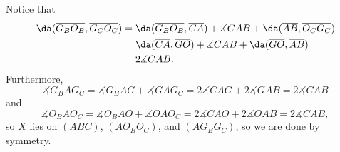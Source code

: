 Notice that
\begin{align*}
    \da(\overline{G_BO_B},\overline{G_CO_C})&=\da(\overline{G_BO_B},\overline{CA})+\measuredangle CAB+\da(\overline{AB},\overline{O_CG_C})\\
    &=\da(\overline{CA},\overline{GO})+\measuredangle CAB+\da(\overline{GO},\overline{AB})\\
    &=2\measuredangle CAB.
\end{align*}
Furthermore, \[\measuredangle G_BAG_C=\measuredangle G_BAG+\measuredangle GAG_C=2\measuredangle CAG+2\measuredangle GAB=2\measuredangle CAB\]
and \[\measuredangle O_BAO_C=\measuredangle O_BAO+\measuredangle OAO_C=2\measuredangle CAO+2\measuredangle OAB=2\measuredangle CAB,\]
so $X$ lies on $(ABC)$, $(AO_BO_C)$, and $(AG_BG_C)$, so we are done by symmetry.
